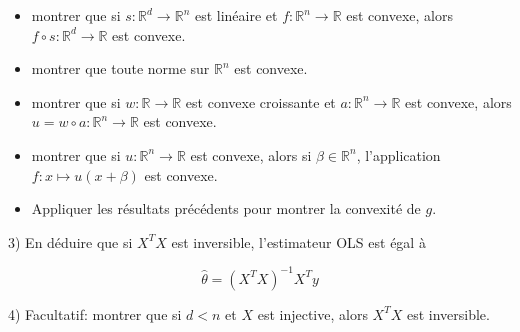 \documentclass[
10pt, %
a4paper, %
oneside, %
headinclude,footinclude, %
BCOR5mm, %
]{scrartcl}
\begin{document}
\begin{itemize}
    \item[a)] montrer que si $s : \mathbb{R}^d \rightarrow \mathbb{R}^n$ est linéaire
        et $f: \mathbb{R}^n \rightarrow \mathbb{R}$ est convexe, alors $ f\circ
        s: \mathbb{R}^d \rightarrow \mathbb{R}$ est convexe.
    \item[b)] montrer que toute norme sur $\mathbb{R}^n$ est convexe.
    \item[c)] montrer que si $w: \mathbb{R}\rightarrow \mathbb{R}$ est convexe
        croissante et $a: \mathbb{R}^n \rightarrow \mathbb{R}$ est convexe, alors
        $u = w\circ a: \mathbb{R}^n \rightarrow \mathbb{R}$ est convexe.
    \item[d)] montrer que si $u: \mathbb{R}^n \rightarrow \mathbb{R}$ est convexe, alors si $\beta\in \mathbb{R}^n$, l'application $f:x\mapsto u(x+\beta)$ est convexe.
    \item[e)] Appliquer les résultats précédents pour montrer la convexité de $g$.
\end{itemize}


3) En déduire que si $X^TX$ est inversible, l'estimateur OLS est égal à 

\begin{equation}
	\hat{ \theta}= (X^TX)^{-1}X^Ty
    \label{eq:ols}
\end{equation}

4) Facultatif: montrer que si $d<n$ et $X$ est injective, alors $X^TX$ est inversible.
\end{document}
